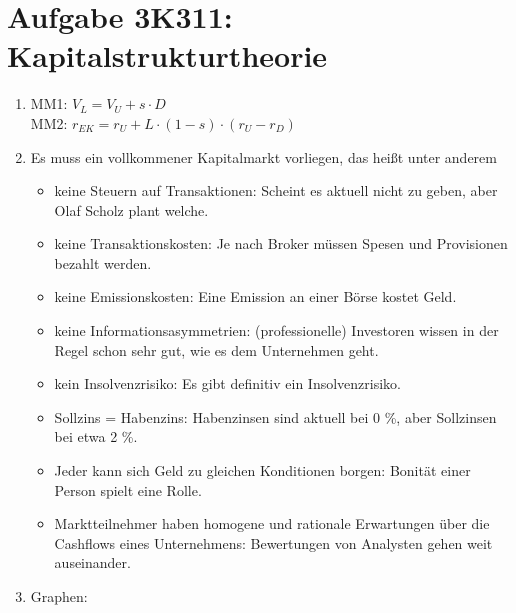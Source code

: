 \documentclass{article}
\begin{document}
	\section*{Aufgabe 3K311: Kapitalstrukturtheorie}
	\begin{enumerate}[label=(\alph*)]
		\item MM1: $V_L=V_U+s\cdot D$ \\
		MM2: $r_{EK}=r_U + L\cdot (1-s)\cdot (r_U-r_D)$
		\item Es muss ein vollkommener Kapitalmarkt vorliegen, das heißt unter anderem
		\begin{itemize}
			\item keine Steuern auf Transaktionen: Scheint es aktuell nicht zu geben, aber Olaf Scholz plant welche.
			\item keine Transaktionskosten: Je nach Broker müssen Spesen und Provisionen bezahlt werden.
			\item keine Emissionskosten: Eine Emission an einer Börse kostet Geld.
			\item keine Informationsasymmetrien: (professionelle) Investoren wissen in der Regel schon sehr gut, wie es dem Unternehmen geht.
			\item kein Insolvenzrisiko: Es gibt definitiv ein Insolvenzrisiko.
			\item Sollzins = Habenzins: Habenzinsen sind aktuell bei 0 \%, aber Sollzinsen bei etwa 2 \%.
			\item Jeder kann sich Geld zu gleichen Konditionen borgen: Bonität einer Person spielt eine Rolle.
			\item Marktteilnehmer haben homogene und rationale Erwartungen über die Cashflows eines Unternehmens: Bewertungen von Analysten gehen weit auseinander.
		\end{itemize}
		\item Graphen:
		\begin{center}
\end{center}
\end{enumerate}
\end{document}
